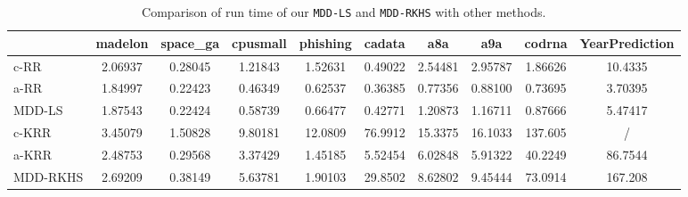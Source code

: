 \documentclass{article}
\begin{document}
\begin{table*}[t]
\small
\footnotesize
   \caption{
    \small Comparison of run time of our \texttt{MDD-LS} and \texttt{MDD-RKHS} with other methods.
   }
   \label{tabel:time}
    \begin{tabular*}{\linewidth}{@{\extracolsep{-0.25cm}}lccccccccc}
    \toprule
                                &madelon                    &space\_ga                   &cpusmall              &phishing           &cadata             &a8a                    &a9a                &cod\-rna            &YearPrediction                \\   \hline
c-RR                            &2.06937                    &0.28045                     &1.21843              &1.52631           &0.49022            &2.54481                &2.95787            &1.86626             &10.4335 \\
a-RR                            &1.84997                    &0.22423                     &0.46349              &0.62537           &0.36385            &0.77356                &0.88100            &0.73695             &3.70395 \\
MDD-LS                          &1.87543                    &0.22424                     &0.58739              &0.66477           &0.42771            &1.20873                &1.16711            &0.87666             &5.47417 \\
\hline \hline
c-KRR                           &3.45079                    &1.50828                     &9.80181              &12.0809           &76.9912            &15.3375                &16.1033            &137.605             &/ \\
a-KRR                           &2.48753                    &0.29568                     &3.37429              &1.45185           &5.52454            &6.02848                &5.91322            &40.2249             &86.7544\\
MDD-RKHS                        &2.69209                    &0.38149                     &5.63781              &1.90103           &29.8502            &8.62802                &9.45444            &73.0914             &167.208\\
   \bottomrule
\end{tabular*}
\vspace{-0.6cm}
\end{table*}
\end{document}
